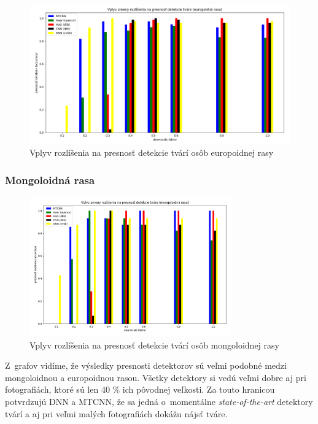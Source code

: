 \documentclass[]{article}
\begin{document}
	\begin{figure}[h!]
		\includegraphics[height=6cm, width=\textwidth]{Vysledky_rozslisenie/europ/Figure_1.png}
		\caption{Vplyv rozlíšenia na presnosť detekcie tvárí osôb europoidnej rasy}
	\end{figure}

	
	\newpage
	\subsubsection*{Mongoloidná rasa}
	\begin{figure}[h!]
		\includegraphics[height=6cm,width=\textwidth]{Vysledky_rozslisenie/mongo/Figure_1.png}
		\caption{Vplyv rozlíšenia na presnosť detekcie tvárí osôb mongoloidnej rasy}
	\end{figure}

	Z~grafov vidíme, že výsledky presnosti detektorov sú veľmi podobné medzi mongoloidnou a europoidnou rasou. Všetky detektory si vedú veľmi dobre aj pri fotografiách, ktoré sú len 40 \% ich pôvodnej veľkosti. Za touto hranicou potvrdzujú DNN a MTCNN, že sa jedná o~momentálne \textit{state-of-the-art} detektory tvárí a aj pri veľmi malých fotografiách dokážu nájsť tváre.
\end{document}
